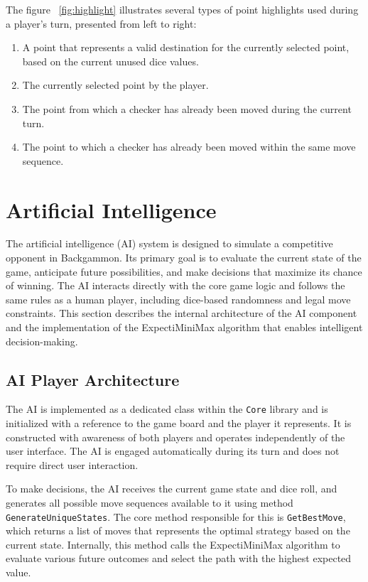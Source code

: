 The figure ~\ref{fig:highlight} illustrates several types of point highlights used during a player's turn, presented from left to right:

\begin{enumerate}
    \item A point that represents a valid destination for the currently selected point, based on the current unused dice values.
    \item The currently selected point by the player.
    \item The point from which a checker has already been moved during the current turn.
    \item The point to which a checker has already been moved within the same move sequence.
\end{enumerate}

\section{Artificial Intelligence}

The artificial intelligence (AI) system is designed to simulate a competitive opponent in Backgammon. Its primary goal is to evaluate the current state of the game, anticipate future possibilities, and make decisions that maximize its chance of winning. The AI interacts directly with the core game logic and follows the same rules as a human player, including dice-based randomness and legal move constraints. This section describes the internal architecture of the AI component and the implementation of the ExpectiMiniMax algorithm that enables intelligent decision-making.

\subsection{AI Player Architecture}

The AI is implemented as a dedicated class within the \texttt{Core} library and is initialized with a reference to the game board and the player it represents. It is constructed with awareness of both players and operates independently of the user interface. The AI is engaged automatically during its turn and does not require direct user interaction.

To make decisions, the AI receives the current game state and dice roll, and generates all possible move sequences available to it using method \texttt{GenerateUniqueStates}. The core method responsible for this is \texttt{GetBestMove}, which returns a list of moves that represents the optimal strategy based on the current state. Internally, this method calls the Expecti\-Mini\-Max algorithm to evaluate various future outcomes and select the path with the highest expected value.

